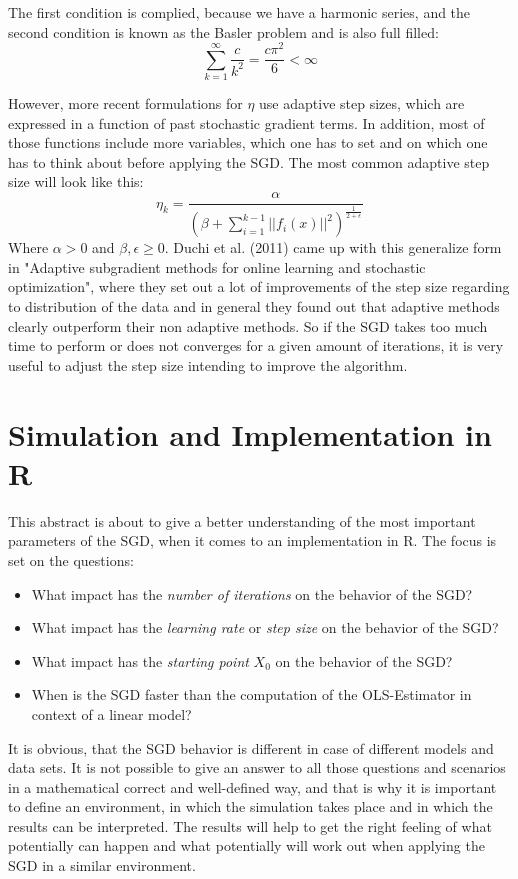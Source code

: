 \documentclass{article}
\begin{document}
The first condition is complied, because we have a harmonic series, and the second condition is known as the Basler problem and is also full filled: \begin{equation}
\sum_{k = 1}^{\infty}\frac{c}{k^2} = \frac{c\pi^2}{6} < \infty 
\end{equation}

However,  more recent  formulations for \( \eta \)  use adaptive step sizes,  which are expressed in a function  of past stochastic gradient terms. In addition, most of those functions include more variables, which one has to set and on which one has to think about before applying the SGD. The most common adaptive step size will look like this: 
\begin{equation}\label{eq:11}
\eta_k = \frac{\alpha}{(\beta + \sum_{i=1}^{k-1}||f_i(x)||^2)^{\frac{1}{2+\epsilon}}}
\end{equation}
Where \( \alpha > 0\) and \( \beta, \epsilon \geq 0\). Duchi et al. (2011) came up with this generalize form in "Adaptive subgradient methods for online learning and stochastic optimization"\cite{duchi2011adaptive}, where they set out a lot of improvements of the step size regarding to distribution of the data and in general they found out that adaptive methods clearly outperform their non adaptive methods. So if the SGD takes too much time to perform or does not converges for a given amount of iterations, it is very useful to adjust the step size intending to improve the algorithm. 

\section{Simulation and Implementation in R}
This abstract is about to give a better understanding of the most important parameters of the SGD, when it comes to an implementation in R. The focus is set on the questions: 
\begin{itemize}
    
    \item What impact has the \textit{number of iterations} on the behavior of the SGD? 
    \item What impact has the \textit{learning rate} or \textit{step size} on the behavior of the SGD? 
    \item What impact has the \textit{starting point} $X_0$ on the behavior of the SGD? 
    \item When is the SGD faster than the computation of the OLS-Estimator in context of a linear model?
\end{itemize}
It is obvious, that the SGD behavior is different in case of different models and data sets. It is not possible to give an answer to all those questions and scenarios in a mathematical correct and well-defined way, and that is why it is important to define an environment, in which the simulation takes place and in which the results can be interpreted. The results will help to get the right feeling of what potentially can happen and what potentially will work out when applying the SGD in a similar environment.
\end{document}
